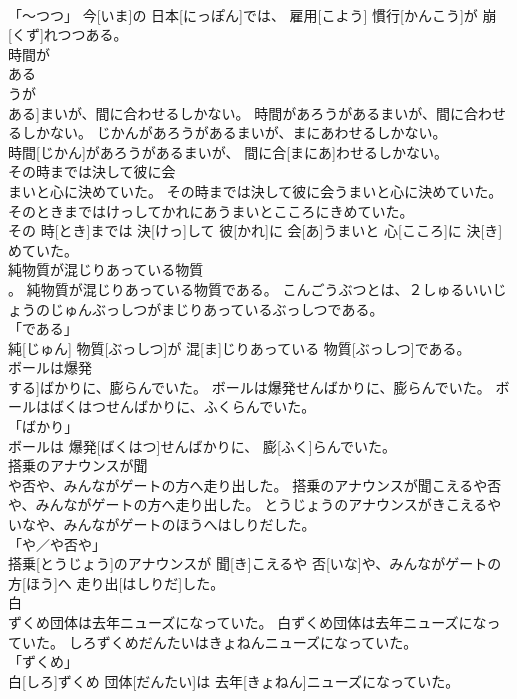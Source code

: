 \documentclass[8pt]{extreport}
\begin{document}
\begin{CJK}{UTF8}{min}
\\	「～つつ」	今[いま]の 日本[にっぽん]では、 雇用[こよう] 慣行[かんこう]が 崩[くず]れつつある。		
\\	時間が
\\	ある 
\\	うが
\\	ある]まいが、間に合わせるしかない。	時間があろうがあるまいが、間に合わせるしかない。	じかんがあろうがあるまいが、まにあわせるしかない。	
\\	時間[じかん]があろうがあるまいが、 間に合[まにあ]わせるしかない。		
\\	その時までは決して彼に会
\\	まいと心に決めていた。	その時までは決して彼に会うまいと心に決めていた。	そのときまではけっしてかれにあうまいとこころにきめていた。	
\\	その 時[とき]までは 決[けっ]して 彼[かれ]に 会[あ]うまいと 心[こころ]に 決[き]めていた。		
\\	純物質が混じりあっている物質
\\	。	純物質が混じりあっている物質である。	こんごうぶつとは、２しゅるいいじょうのじゅんぶっしつがまじりあっているぶっしつである。	
\\	「である」 
\\	純[じゅん] 物質[ぶっしつ]が 混[ま]じりあっている 物質[ぶっしつ]である。		
\\	ボールは爆発
\\	する]ばかりに、膨らんでいた。	ボールは爆発せんばかりに、膨らんでいた。	ボールはばくはつせんばかりに、ふくらんでいた。	
\\	「ばかり」 
\\	ボールは 爆発[ばくはつ]せんばかりに、 膨[ふく]らんでいた。		
\\	搭乗のアナウンスが聞
\\	や否や、みんながゲートの方へ走り出した。	搭乗のアナウンスが聞こえるや否や、みんながゲートの方へ走り出した。	とうじょうのアナウンスがきこえるやいなや、みんながゲートのほうへはしりだした。	
\\	「や／や否や」 
\\	搭乗[とうじょう]のアナウンスが 聞[き]こえるや 否[いな]や、みんながゲートの 方[ほう]へ 走り出[はしりだ]した。		
\\	白
\\	ずくめ団体は去年ニューズになっていた。	白ずくめ団体は去年ニューズになっていた。	しろずくめだんたいはきょねんニューズになっていた。	
\\	「ずくめ」 
\\	白[しろ]ずくめ 団体[だんたい]は 去年[きょねん]ニューズになっていた。		

\end{CJK}
\end{document}
